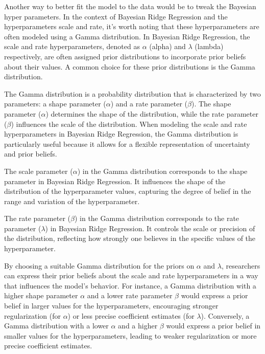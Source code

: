 \documentclass{article}
\begin{document}
Another way to better fit the model to the data would be to tweak the Bayesian
hyper parameters. In the context of Bayesian Ridge Regression and the hyperparameters
scale and rate, it's worth noting that these hyperparameters are often modeled using a
Gamma distribution. In Bayesian Ridge Regression, the scale and rate hyperparameters,
denoted as $\alpha$ (alpha) and $\lambda$ (lambda) respectively, are often assigned prior distributions to
incorporate prior beliefs about their values. A common choice for these prior
distributions is the Gamma distribution.

The Gamma distribution is a probability distribution that is characterized by two
parameters: a shape parameter ($\alpha$) and a rate parameter ($\beta$). The shape parameter ($\alpha$)
determines the shape of the distribution, while the rate parameter ($\beta$) influences the scale
of the distribution. When modeling the scale and rate hyperparameters in Bayesian Ridge
Regression, the Gamma distribution is particularly useful because it allows for a flexible
representation of uncertainty and prior beliefs.

The scale parameter ($\alpha$) in the Gamma distribution corresponds to the shape
parameter in Bayesian Ridge Regression. It influences the shape of the distribution of the
hyperparameter values, capturing the degree of belief in the range and variation of the
hyperparameter.

The rate parameter ($\beta$) in the Gamma distribution corresponds to the rate
parameter ($\lambda$) in Bayesian Ridge Regression. It controls the scale or precision of the
distribution, reflecting how strongly one believes in the specific values of the
hyperparameter.

By choosing a suitable Gamma distribution for the priors on $\alpha$ and $\lambda$, researchers
can express their prior beliefs about the scale and rate hyperparameters in a way that
influences the model's behavior. For instance, a Gamma distribution with a higher shape
parameter $\alpha$ and a lower rate parameter $\beta$ would express a prior belief in larger values for
the hyperparameters, encouraging stronger regularization (for $\alpha$) or less precise
coefficient estimates (for $\lambda$). Conversely, a Gamma distribution with a lower $\alpha$ and a
higher $\beta$ would express a prior belief in smaller values for the hyperparameters, leading
to weaker regularization or more precise coefficient estimates.
\end{document}
